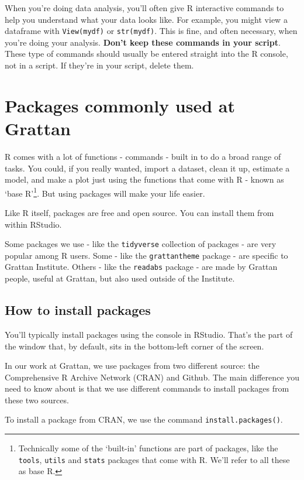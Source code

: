\documentclass[]{book}
\begin{document}
When you're doing data analysis, you'll often give R interactive commands to help you understand what your data looks like. For example, you might view a dataframe with \texttt{View(mydf)} or \texttt{str(mydf)}. This is fine, and often necessary, when you're doing your analysis. \textbf{Don't keep these commands in your script}. These type of commands should usually be entered straight into the R console, not in a script. If they're in your script, delete them.

\hypertarget{packages}{%
\chapter{Packages commonly used at Grattan}\label{packages}}

R comes with a lot of functions - commands - built in to do a broad range of tasks. You could, if you really wanted, import a dataset, clean it up, estimate a model, and make a plot just using the functions that come with R - known as `base R'\footnote{Technically some of the `built-in' functions are part of packages, like the \texttt{tools}, \texttt{utils} and \texttt{stats} packages that come with R. We'll refer to all these as base R.}. But using packages will make your life easier.

Like R itself, packages are free and open source. You can install them from within RStudio.

Some packages we use - like the \texttt{tidyverse} collection of packages - are very popular among R users. Some - like the \texttt{grattantheme} package - are specific to Grattan Institute. Others - like the \texttt{readabs} package - are made by Grattan people, useful at Grattan, but also used outside of the Institute.

\hypertarget{install-packages}{%
\section{How to install packages}\label{install-packages}}

You'll typically install packages using the console in RStudio. That's the part of the window that, by default, sits in the bottom-left corner of the screen.

In our work at Grattan, we use packages from two different source: the Comprehensive R Archive Network (CRAN) and Github. The main difference you need to know about is that we use different commands to install packages from these two sources.

To install a package from CRAN, we use the command \texttt{install.packages()}.
\end{document}
